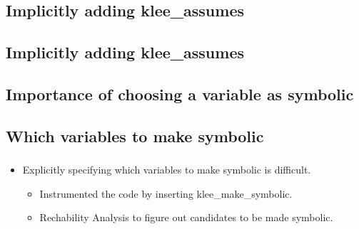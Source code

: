 \documentclass[mathserif,10pt]{beamer}
\newcommand{\cmt}[1]{}
\begin{document}
\subsection{Implicitly adding klee\_assumes}
\frame
{
  \frametitle{\subsecname}
  \lstII
    \cmt{
    Without the klee_assume, the dereference z->x may get resolved to many
      spurious memory objects. But while dealing with pointer analysis results
      we assume that the index of gptr is within bounds and as a result we are
      getting false positives that (The set of allocation sites corresponding
          to the memory object of the load address, z->x) is NOT a subset of
      (Points to allocation sites for the load address z->x) 
    }

}

\subsection{Implicitly adding klee\_assumes}
\frame
{
  \frametitle{\subsecname}
  \lstIITWO
    \cmt{
    Without the klee_assume, the dereference z->x may get resolved to many
      spurious memory objects. But while dealing with pointer analysis results
      we assume that the index of gptr is within bounds and as a result we are
      getting false positives that (The set of allocation sites corresponding
          to the memory object of the load address, z->x) is NOT a subset of
      (Points to allocation sites for the load address z->x) 
    }

}

\subsection{Importance of choosing a variable as symbolic}
\frame
{
  \frametitle{\subsecname}
  \lstI

}

\subsection{Which variables to make symbolic}
\frame
{
  \frametitle{\subsecname}
  \begin{itemize}
    \item Explicitly specifying which variables to make symbolic is difficult. 
    \vspace{1cm}
    \begin{itemize}
      \item Instrumented the code by inserting klee\_make\_symbolic.
      \item Rechability Analysis to figure out candidates to be made symbolic.
    \end{itemize}
  \end{itemize}
  \cmt{
    Rather that explicitly making the  inputs of the test program
      symbolic, let klee instrument the code by inserting klee_make_symbolic
      calls. The inputs that we are considering include command line arguments,
      file inputs, globals and variables used to read inputs (for example using
          scanf).
  }
}
\end{document}
